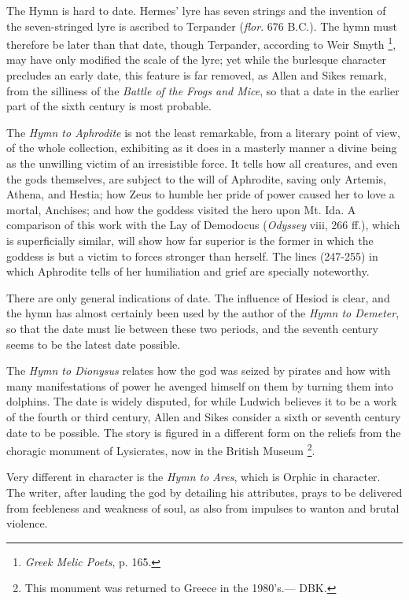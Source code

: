 The Hymn is hard to date. Hermes’ lyre has seven strings and the
invention of the seven-stringed lyre is ascribed to Terpander (\emph{flor}. 676
B.C.). The hymn must therefore be later than that date, though Terpander,
according to Weir Smyth \footnote{\emph{Greek Melic Poets},
p. 165.}, may have only modified the scale
of the lyre; yet while the burlesque character precludes an early date, this
feature is far removed, as Allen and Sikes remark, from the silliness of the
\emph{Battle of the Frogs and Mice}, so that a date in the earlier part of the
sixth century is most probable.

The \emph{Hymn to Aphrodite} is not the least remarkable, from a literary point
of view, of the whole collection, exhibiting as it does in a masterly manner a
divine being as the unwilling victim of an irresistible force. It tells how all
creatures, and even the gods themselves, are subject to the will of Aphrodite,
saving only Artemis, Athena, and Hestia; how Zeus to humble her pride of power
caused her to love a mortal, Anchises; and how the goddess visited the hero
upon Mt. Ida. A comparison of this work with the Lay of Demodocus
(\emph{Odyssey} viii, 266 ff.), which is superficially similar, will show how
far superior is the former in which the goddess is but a victim to forces
stronger than herself. The lines (247-255) in which Aphrodite tells of her
humiliation and grief are specially noteworthy.

There are only general indications of date. The influence of Hesiod is clear,
and the hymn has almost certainly been used by the author of the \emph{Hymn to
Demeter}, so that the date must lie between these two periods, and the
seventh century seems to be the latest date possible.

The \emph{Hymn to Dionysus} relates how the god was seized by pirates and how
with many manifestations of power he avenged himself on them by turning them
into dolphins. The date is widely disputed, for while Ludwich believes it to be
a work of the fourth or third century, Allen and Sikes consider a sixth or
seventh century date to be possible. The story is figured in a different form
on the reliefs from the choragic monument of Lysicrates, now in the British
Museum \footnote{This monument was returned
to Greece in the 1980’s.— DBK.}.

Very different in character is the \emph{Hymn to Ares}, which is Orphic in
character. The writer, after lauding the god by detailing his attributes, prays
to be delivered from feebleness and weakness of soul, as also from impulses to
wanton and brutal violence.

